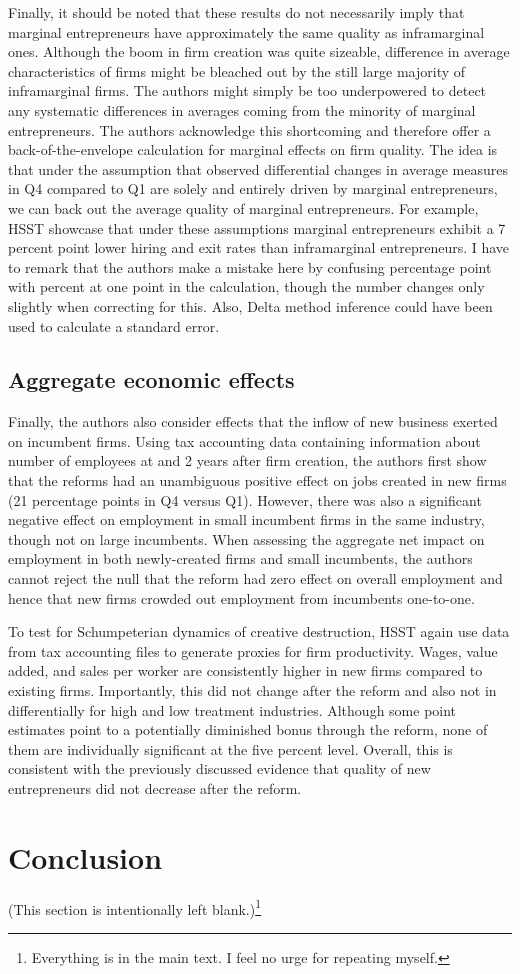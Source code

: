 Finally, it should be noted that these results do not necessarily imply that marginal entrepreneurs have approximately the same quality as inframarginal ones. Although the boom in firm creation was quite sizeable, difference in average characteristics of firms might be bleached out by the still large majority of inframarginal firms. The authors might simply be too underpowered to detect any systematic differences in averages coming from the minority of marginal entrepreneurs.
The authors acknowledge this shortcoming and therefore offer a back-of-the-envelope calculation for marginal effects on firm quality. The idea is that under the assumption that observed differential changes in average measures in Q4 compared to Q1 are solely and entirely driven by marginal entrepreneurs, we can back out the average quality of marginal entrepreneurs. For example, HSST showcase that under these assumptions marginal entrepreneurs exhibit a 7 percent point lower hiring and exit rates than inframarginal entrepreneurs. I have to remark that the authors make a mistake here by confusing percentage point with percent at one point in the calculation, though the number changes only slightly when correcting for this. Also, Delta method inference could have been used to calculate a standard error.


\subsection{Aggregate economic effects}

Finally, the authors also consider effects that the inflow of new business exerted on incumbent firms. Using tax accounting data containing information about number of employees at and 2 years after firm creation, the authors first show that the reforms had an unambiguous positive effect on jobs created in new firms (21 percentage points in Q4 versus Q1). However, there was also a significant negative effect on employment in small incumbent firms in the same industry, though not on large incumbents. When assessing the aggregate net impact on employment in both newly-created firms and small incumbents, the authors cannot reject the null that the reform had zero effect on overall employment and hence that new firms crowded out employment from incumbents one-to-one.

To test for Schumpeterian dynamics of creative destruction, HSST again use data from tax accounting files to generate proxies for firm productivity. Wages, value added, and sales per worker are consistently higher in new firms compared to existing firms. Importantly, this did not change after the reform and also not in differentially for high and low treatment industries. Although some point estimates point to a potentially diminished bonus through the reform, none of them are individually significant at the five percent level. Overall, this is consistent with the previously discussed evidence that quality of new entrepreneurs did not decrease after the reform.

\section{Conclusion}

(This section is intentionally left blank.)\footnote{Everything is in the main text. I feel no urge for repeating myself.}